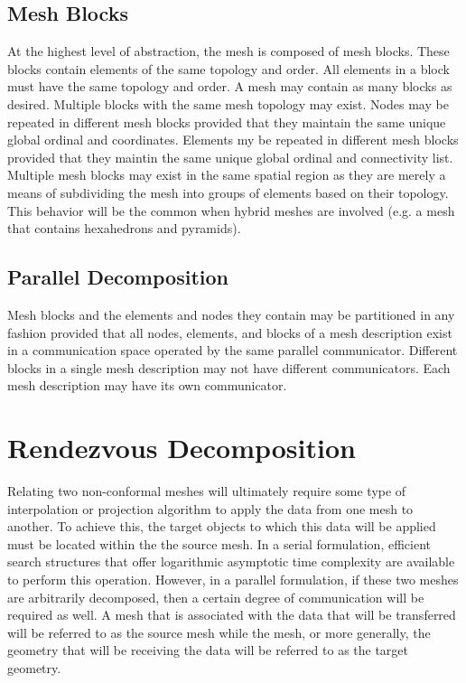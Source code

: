 \documentclass[letterpaper]{article}
\begin{document}
\subsection{Mesh Blocks}
At the highest level of abstraction, the mesh is composed of mesh
blocks. These blocks contain elements of the same topology and
order. All elements in a block must have the same topology and
order. A mesh may contain as many blocks as desired. Multiple blocks
with the same mesh topology may exist. Nodes may be repeated in
different mesh blocks provided that they maintain the same unique
global ordinal and coordinates. Elements my be repeated in different
mesh blocks provided that they maintin the same unique global ordinal
and connectivity list. Multiple mesh blocks may exist in the same
spatial region as they are merely a means of subdividing the mesh into
groups of elements based on their topology. This behavior will be the
common when hybrid meshes are involved (e.g. a mesh that contains
hexahedrons and pyramids).

\subsection{Parallel Decomposition}
Mesh blocks and the elements and nodes they contain may be partitioned
in any fashion provided that all nodes, elements, and blocks of a mesh
description exist in a communication space operated by the same
parallel communicator. Different blocks in a single mesh description
may not have different communicators. Each mesh description may have
its own communicator.

\section{Rendezvous Decomposition}
Relating two non-conformal meshes will ultimately require some type of
interpolation or projection algorithm to apply the data from one mesh
to another. To achieve this, the target objects to which this data
will be applied must be located within the the source mesh. In a
serial formulation, efficient search structures that offer logarithmic
asymptotic time complexity are available to perform this
operation. However, in a parallel formulation, if these two meshes are
arbitrarily decomposed, then a certain degree of communication will be
required as well. A mesh that is associated with the data that will be
transferred will be referred to as the source mesh while the mesh, or
more generally, the geometry that will be receiving the data will be
referred to as the target geometry.
\end{document}
